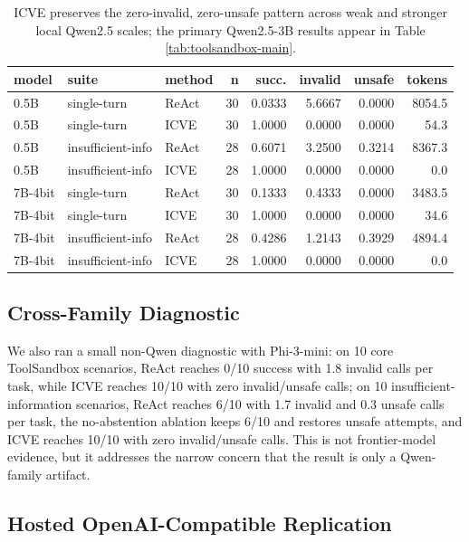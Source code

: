 \documentclass[11pt]{article}
\newcommand{\icve}{ICVE\xspace}
\begin{document}
\begin{table}[t]
\centering
\scriptsize
\setlength{\tabcolsep}{4pt}
\begin{tabular}{lllrrrrr}
\toprule
model & suite & method & n & succ. & invalid & unsafe & tokens \\
\midrule
0.5B & single-turn & ReAct & 30 & 0.0333 & 5.6667 & 0.0000 & 8054.5 \\
0.5B & single-turn & \icve & 30 & 1.0000 & 0.0000 & 0.0000 & 54.3 \\
0.5B & insufficient-info & ReAct & 28 & 0.6071 & 3.2500 & 0.3214 & 8367.3 \\
0.5B & insufficient-info & \icve & 28 & 1.0000 & 0.0000 & 0.0000 & 0.0 \\
7B-4bit & single-turn & ReAct & 30 & 0.1333 & 0.4333 & 0.0000 & 3483.5 \\
7B-4bit & single-turn & \icve & 30 & 1.0000 & 0.0000 & 0.0000 & 34.6 \\
7B-4bit & insufficient-info & ReAct & 28 & 0.4286 & 1.2143 & 0.3929 & 4894.4 \\
7B-4bit & insufficient-info & \icve & 28 & 1.0000 & 0.0000 & 0.0000 & 0.0 \\
\bottomrule
\end{tabular}
\caption{ICVE preserves the zero-invalid, zero-unsafe pattern across weak and stronger
local Qwen2.5 scales; the primary Qwen2.5-3B results appear in Table
\ref{tab:toolsandbox-main}.}
\label{tab:model-scale}
\end{table}

\subsection{Cross-Family Diagnostic}

We also ran a small non-Qwen diagnostic with Phi-3-mini: on 10 core ToolSandbox
scenarios, ReAct reaches 0/10 success with 1.8 invalid calls per task, while ICVE reaches
10/10 with zero invalid/unsafe calls; on 10 insufficient-information scenarios, ReAct
reaches 6/10 with 1.7 invalid and 0.3 unsafe calls per task, the no-abstention ablation
keeps 6/10 and restores unsafe attempts, and ICVE reaches 10/10 with zero
invalid/unsafe calls. This is not frontier-model evidence, but it addresses the narrow
concern that the result is only a Qwen-family artifact.

\subsection{Hosted OpenAI-Compatible Replication}
\end{document}
